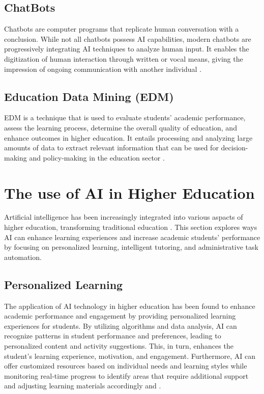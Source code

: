 \subsection{ ChatBots }
Chatbots are computer programs that replicate human conversation with a conclusion.
While not all chatbots possess AI capabilities, modern chatbots are progressively
integrating AI techniques to analyze human input\citep{IBM_withnodate}.
It enables the digitization of human interaction through written or vocal means,
giving the impression of ongoing communication with another individual \citep{oracle_what_nodate}.
\subsection{Education Data Mining (EDM)}
EDM is a technique that is used to evaluate students' academic performance,
assess the learning process, determine the overall quality of education, and enhance outcomes in higher education.
It entails processing and analyzing large amounts of data to extract relevant information that can be used for
decision-making and policy-making in the education sector \citep{arifin_using_2022}.


\section{The use of AI in Higher Education }\label{use-ai}
\justifying
Artificial intelligence has been increasingly integrated into various aspacts of higher
education, transforming traditional education \citep{wang_exploring_2023}.  This section explores ways
AI can enhance learning experiences and increase academic students' performance by focusing on
personalized learning, intelligent tutoring, and administrative task automation.
\subsection{Personalized Learning}
The application of AI technology in higher education has been found to enhance academic performance
and engagement by providing personalized learning experiences for students. By utilizing algorithms
and data analysis, AI can recognize patterns in student performance and preferences, leading to personalized
content and activity suggestions. This, in turn, enhances the student’s learning experience, motivation, and
engagement. Furthermore, AI can offer customized resources based on individual needs and learning styles while
monitoring real-time progress to identify areas that require additional support and adjusting learning materials
accordingly \citep{guerrero-quinonez_artificial_2023} and \citep{l_d_of_cs_akshara_first_grade_college_2023}.


